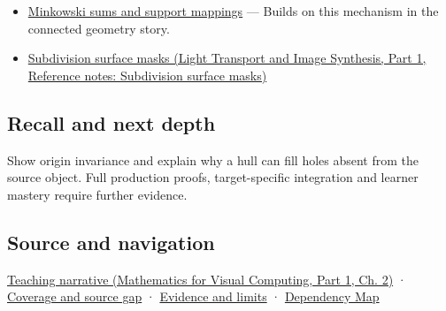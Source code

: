 \hypertarget{appendix-0026ec42c9d5-used-by}{}

\begin{itemize}
\tightlist
\item
  \hyperref[appendix-215ac7099a82]{Minkowski sums and support mappings} --- Builds on this mechanism in the connected geometry story.
\item
  \href{../04-Light-Transport-and-Image-Synthesis-P01/main.pdf\#appendix-0234ab7f86b1}{Subdivision surface masks (Light Transport and Image Synthesis, Part 1, Reference notes: Subdivision surface masks)}
\end{itemize}

\subsection{Recall and next depth}\label{appendix-0026ec42c9d5-recall-and-next-depth}

\hypertarget{appendix-0026ec42c9d5-recall-and-next-depth}{}

Show origin invariance and explain why a hull can fill holes absent from the source object. Full production proofs, target-specific integration and learner mastery require further evidence.

\subsection{Source and navigation}\label{appendix-0026ec42c9d5-source-and-navigation}

\hypertarget{appendix-0026ec42c9d5-source-and-navigation}{}

\href{../02-Mathematics-for-Visual-Computing-P01/main.pdf\#01-foundations-i-ch018-weighted-points-lead-from-affine-geometry-to-collision-shapes}{Teaching narrative (Mathematics for Visual Computing, Part 1, Ch. 2)} · \hyperref[appendix-fd090d982a15-phase-6---parts-501-600]{Coverage and source gap} · \hyperref[appendix-a103e7846d21-phase-6---source-analysis-and-verification]{Evidence and limits} · \hyperref[appendix-4ad47bdd269a]{Dependency Map}
